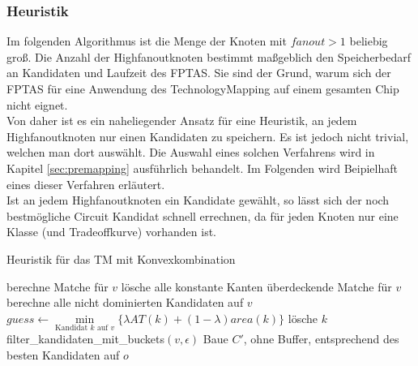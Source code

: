\documentclass[11pt, a4paper, german]{article}
\newcommand{\TM}{TechnologyMapping }
\begin{document}
\subsubsection{Heuristik}
\label{subsubsec:heuristik}
Im folgenden Algorithmus ist die Menge der Knoten mit $fanout > 1$ beliebig groß.
Die Anzahl der Highfanoutknoten bestimmt maßgeblich den Speicherbedarf an Kandidaten und Laufzeit des FPTAS. Sie sind der Grund, warum sich der FPTAS für eine Anwendung des \TM auf einem gesamten Chip nicht eignet. \\
Von daher ist es ein naheliegender Ansatz für eine Heuristik, an jedem Highfanoutknoten nur einen Kandidaten zu speichern. Es ist jedoch nicht trivial, welchen man dort auswählt. Die Auswahl eines solchen Verfahrens wird in Kapitel \ref{sec:premapping} ausführlich behandelt. Im Folgenden wird Beipielhaft eines dieser Verfahren erläutert. \\
Ist an jedem Highfanoutknoten ein Kandidate gewählt, so lässt sich der noch bestmögliche Circuit Kandidat schnell errechnen, da für jeden Knoten nur eine Klasse (und Tradeoffkurve) vorhanden ist.\\
\begin{algorithm}[H]
 \LinesNumbered
 \DontPrintSemicolon
 \caption{Heuristik f\"ur das TM mit Konvexkombination}
 {
  berechne Matche für $v$\;
  lösche alle konstante Kanten überdeckende Matche für $v$\;
  berechne alle nicht dominierten Kandidaten auf $v$\;
  {
    $guess \gets \min\limits_{\text{Kandidat }k\text{ auf }v}\{ \lambda AT(k) + (1-\lambda) area(k)  \}$\;
    {
      {
	l\"osche $k$\;
      }
    }
  }
  filter\_kandidaten\_mit\_buckets$(v,\epsilon)$\;
 }
 Baue $C'$, ohne Buffer, entsprechend des besten Kandidaten auf $o$ \; 
\end{algorithm}\ \\
\end{document}
